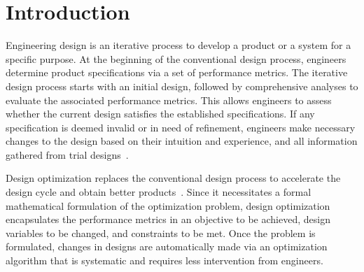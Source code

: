 \documentclass[iicol,sn-basic]{sn-jnl}%
\begin{document}
\section{Introduction}\label{Sec1}

Engineering design is an iterative process to develop a product or a system for a specific purpose.
At the beginning of the conventional design process, engineers determine product specifications via a set of performance metrics.
The iterative design process starts with an initial design, followed by comprehensive analyses to evaluate the associated performance metrics.
This allows engineers to assess whether the current design satisfies the established specifications.
If any specification is deemed invalid or in need of refinement, engineers make necessary changes to the design based on their intuition and experience, and all information gathered from trial designs~\citep{Arora2016}.

Design optimization replaces the conventional design process to accelerate the design cycle and obtain better products~\citep{Kochenderfer2019,Martins2021}.
Since it necessitates a formal mathematical formulation of the optimization problem, design optimization encapsulates the performance metrics in an objective to be achieved, design variables to be changed, and constraints to be met.
Once the problem is formulated, changes in designs are automatically made via an optimization algorithm that is systematic and requires less intervention from engineers.
\end{document}
